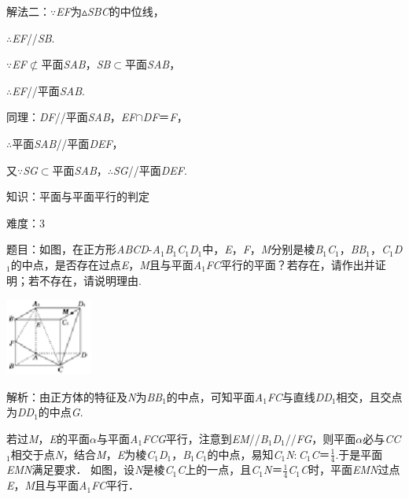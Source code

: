 \documentclass{article} %
\begin{document}
解法二：$\mathrm{\because}$\textit{EF}为$\mathrm{\vartriangle}$\textit{SBC}的中位线，

$\mathrm{\therefore}$\textit{EF}//\textit{SB}.

$\mathrm{\because}$\textit{EF}$\mathrm{\nsubset}$平面\textit{SAB}，\textit{SB}$\mathrm{\subset }$平面\textit{SAB}，

$\mathrm{\therefore}$\textit{EF}//平面\textit{SAB}.

同理：\textit{DF}//平面\textit{SAB}，\textit{EF}$\mathrm{\cap}$\textit{DF}＝\textit{F}，

$\mathrm{\therefore}$平面\textit{SAB}//平面\textit{DEF}，

又$\mathrm{\because}$\textit{SG}$\mathrm{\subset }$平面\textit{SAB}，$\mathrm{\therefore}$\textit{SG}//平面\textit{DEF}.

知识：平面与平面平行的判定

难度：3

题目：如图，在正方形\textit{ABCD}-\textit{A}${}_{1}$\textit{B}${}_{1}$\textit{C}${}_{1}$\textit{D}${}_{1}$中，\textit{E}，\textit{F}，\textit{M}分别是棱\textit{B}${}_{1}$\textit{C}${}_{1}$，\textit{BB}${}_{1}$，\textit{C}${}_{1}$\textit{D}${}_{1}$的中点，是否存在过点\textit{E}，\textit{M}且与平面\textit{A}${}_{1}$\textit{FC}平行的平面？若存在，请作出并证明；若不存在，请说明理由.

\includegraphics*[width=1.12in, height=1.00in, keepaspectratio=false]{image156}

解析：由正方体的特征及\textit{N}为\textit{BB}${}_{1}$的中点，可知平面\textit{A}${}_{1}$\textit{FC}与直线\textit{DD}${}_{1}$相交，且交点为\textit{DD}${}_{1}$的中点\textit{G}.

若过\textit{M}，\textit{E}的平面\textit{$\alpha$}与平面\textit{A}${}_{1}$\textit{FCG}平行，注意到\textit{EM}//\textit{B}${}_{1}$\textit{D}${}_{1}$//\textit{FG}，则平面\textit{$\alpha$}必与\textit{CC}${}_{1}$相交于点\textit{N}，结合\textit{M}，\textit{E}为棱\textit{C}${}_{1}$\textit{D}${}_{1}$，\textit{B}${}_{1}$\textit{C}${}_{1}$的中点，易知\textit{C}${}_{1}$\textit{N}$\mathrm{:}$\textit{C}${}_{1}$\textit{C}＝$\frac{1}{4}$.于是平面\textit{EMN}满足要求．
如图，设\textit{N}是棱\textit{C}${}_{1}$\textit{C}上的一点，且\textit{C}${}_{1}$\textit{N}＝$\frac{1}{4}$\textit{C}${}_{1}$\textit{C}时，平面\textit{EMN}过点\textit{E}，\textit{M}且与平面\textit{A}${}_{1}$\textit{FC}平行．
\end{document}
